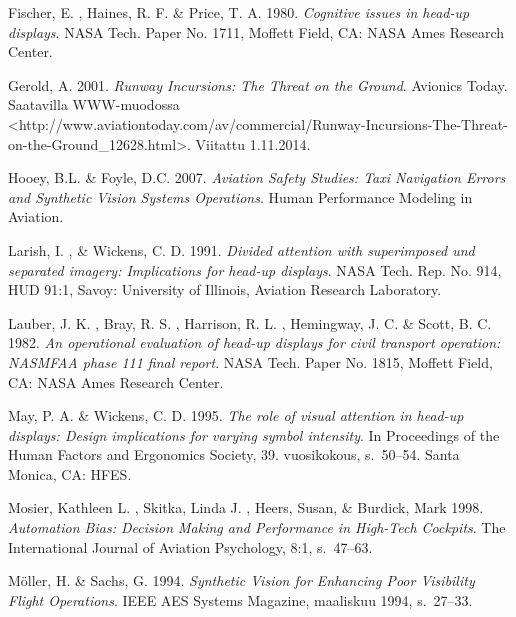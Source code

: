 \documentclass[utf8,bachelor,manualbib]{gradu3}
\begin{document}
\begin{thebibliography}{}
Fischer, E. , Haines, R. F. \& Price, T. A. 1980.
\textit{Cognitive issues in head-up displays}.
NASA Tech. Paper No. 1711, Moffett Field, CA: NASA Ames Research Center.

Gerold, A. 2001.
\textit{Runway Incursions: The Threat on the Ground}.
Avionics Today.
Saatavilla WWW-muodossa
<http://www.aviationtoday.com/av/commercial/Runway-Incursions-The-Threat-on-the-Ground\_12628.html>. Viitattu 1.11.2014.

Hooey, B.L. \& Foyle, D.C. 2007.
\textit{Aviation Safety Studies: Taxi Navigation Errors and Synthetic Vision Systems Operations}.
Human Performance Modeling in Aviation.

Larish, I. , \& Wickens, C. D. 1991.
\textit{Divided attention with superimposed und separated imagery: Implications for head-up displays}.
NASA Tech. Rep. No. 914, HUD 91:1, Savoy: University of Illinois, Aviation Research Laboratory.

Lauber, J. K. , Bray, R. S. , Harrison, R. L. , Hemingway, J. C. \& Scott, B. C. 1982.
\textit{An operational evaluation of head-up displays for civil transport operation: NASMFAA phase 111 final report}.
NASA Tech. Paper No. 1815, Moffett Field, CA: NASA Ames Research Center.

May, P. A. \& Wickens, C. D. 1995.
\textit{The role of visual attention in head-up displays: Design implications
for varying symbol intensity}.
In Proceedings of the Human Factors and Ergonomics Society, 39. vuosikokous, s.~50--54. Santa Monica, CA: HFES.

Mosier, Kathleen L. , Skitka, Linda J. , Heers, Susan, \& Burdick, Mark 1998.
\textit{Automation Bias: Decision Making and Performance in High-Tech Cockpits}.
The International Journal of Aviation Psychology, 8:1, s.~47--63.

Möller, H. \& Sachs, G. 1994.
\textit{Synthetic Vision for Enhancing Poor Visibility Flight Operations}.
IEEE AES Systems Magazine, maaliskuu 1994, s.~27--33.


\end{thebibliography}
\end{document}
